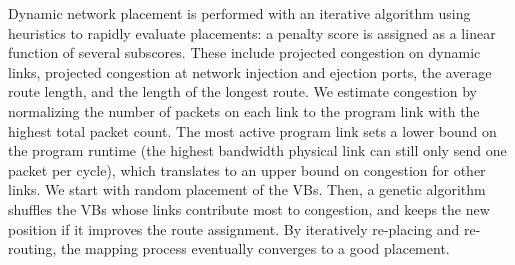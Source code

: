 Dynamic network placement is performed with an iterative algorithm using heuristics to rapidly evaluate placements: a penalty score is assigned as a linear function of several subscores.
These include projected congestion on dynamic links, projected congestion at network injection and ejection ports, the average route length, and the length of the longest route.
We estimate congestion by normalizing the number of packets on each link to the program link with the highest total packet count.
The most active program link sets a lower bound on the program runtime (the highest bandwidth physical link can still only send one packet per cycle), which translates to an upper bound on congestion for other links.
We start with random placement of the VBs.
Then, a genetic algorithm shuffles the VBs whose links contribute most to congestion, and keeps the new position if it improves the route assignment.
By iteratively re-placing and re-routing, the mapping process eventually converges to a good placement.

